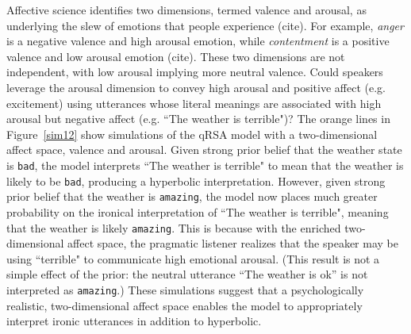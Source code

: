 \documentclass[10pt,letterpaper]{article}
\begin{document}
Affective science identifies two dimensions, termed valence and arousal, as underlying the slew of emotions that people experience (cite). 
For example, \emph{anger} is a negative valence and high arousal emotion, while \emph{contentment} is a positive valence and low arousal emotion (cite). 
These two dimensions are not independent, with low arousal implying more neutral valence. 
Could speakers leverage the arousal dimension to convey high arousal and positive affect (e.g. excitement) using utterances whose literal meanings are associated with high arousal but negative affect (e.g. ``The weather is terrible")? The orange lines in Figure~\ref{sim12} show simulations of the qRSA model with a two-dimensional affect space, valence and arousal. Given strong prior belief that the weather state is \texttt{bad}, the model interprets ``The weather is terrible" to mean that the weather is likely to be \texttt{bad}, producing a hyperbolic interpretation. However, given strong prior belief that the weather is \texttt{amazing}, the model now places much greater probability on the ironical interpretation of ``The weather is terrible", meaning that the weather is likely \texttt{amazing}. This is because with the enriched two-dimensional affect space, the pragmatic listener realizes that the speaker may be using ``terrible" to communicate high emotional arousal. (This result is not a simple effect of the prior: the neutral utterance ``The weather is ok'' is not interpreted as \texttt{amazing}.) These simulations suggest that a psychologically realistic, two-dimensional affect space enables the model to appropriately interpret ironic utterances in addition to hyperbolic. 




\end{document}
